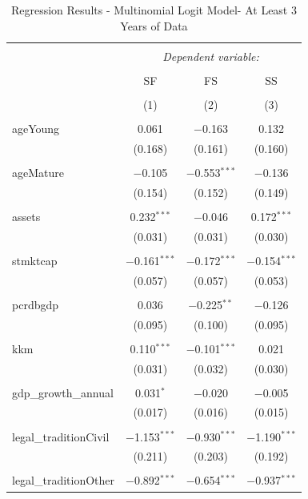 \documentclass[a4paper, nobind]{templates/ociamthesis}
\begin{document}
\begin{table}[!htbp] \centering 
  \caption{Regression Results - Multinomial Logit Model- At Least 3 Years of Data} 
  \label{} 
\footnotesize 
\begin{tabular}{@{\extracolsep{5pt}}lccc} 
\\[-1.8ex]\hline 
\hline \\[-1.8ex] 
 & \multicolumn{3}{c}{\textit{Dependent variable:}} \\ 
\cline{2-4} 
\\[-1.8ex] & SF & FS & SS \\ 
\\[-1.8ex] & (1) & (2) & (3)\\ 
\hline \\[-1.8ex] 
 ageYoung & 0.061 & $-$0.163 & 0.132 \\ 
  & (0.168) & (0.161) & (0.160) \\ 
  & & & \\ 
 ageMature & $-$0.105 & $-$0.553$^{***}$ & $-$0.136 \\ 
  & (0.154) & (0.152) & (0.149) \\ 
  & & & \\ 
 assets & 0.232$^{***}$ & $-$0.046 & 0.172$^{***}$ \\ 
  & (0.031) & (0.031) & (0.030) \\ 
  & & & \\ 
 stmktcap & $-$0.161$^{***}$ & $-$0.172$^{***}$ & $-$0.154$^{***}$ \\ 
  & (0.057) & (0.057) & (0.053) \\ 
  & & & \\ 
 pcrdbgdp & 0.036 & $-$0.225$^{**}$ & $-$0.126 \\ 
  & (0.095) & (0.100) & (0.095) \\ 
  & & & \\ 
 kkm & 0.110$^{***}$ & $-$0.101$^{***}$ & 0.021 \\ 
  & (0.031) & (0.032) & (0.030) \\ 
  & & & \\ 
 gdp\_growth\_annual & 0.031$^{*}$ & $-$0.020 & $-$0.005 \\ 
  & (0.017) & (0.016) & (0.015) \\ 
  & & & \\ 
 legal\_traditionCivil & $-$1.153$^{***}$ & $-$0.930$^{***}$ & $-$1.190$^{***}$ \\ 
  & (0.211) & (0.203) & (0.192) \\ 
  & & & \\ 
 legal\_traditionOther & $-$0.892$^{***}$ & $-$0.654$^{***}$ & $-$0.937$^{***}$ \\ 

\end{tabular}
\end{table}
\end{document}
